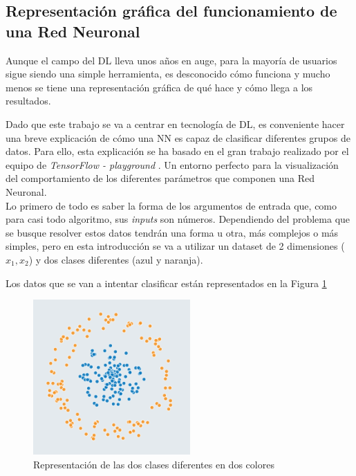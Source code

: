 \subsection{Representación gráfica del funcionamiento de una Red Neuronal}
\label{sec:funcionamiento_DL}

Aunque el campo del DL lleva unos años en auge, para la mayoría de usuarios sigue siendo una simple herramienta, es desconocido cómo funciona y mucho menos se tiene una representación gráfica de qué hace y cómo llega a los resultados.

Dado que este trabajo se va a centrar en tecnología de DL, es conveniente hacer una breve explicación de cómo una NN es capaz de clasificar diferentes grupos de datos. Para ello, esta explicación se ha basado en el gran trabajo realizado por el equipo de \textit{TensorFlow - playground} \cite{TensorFlow_playground}. Un entorno perfecto para la visualización del comportamiento de los diferentes parámetros que componen una Red Neuronal.\\

Lo primero de todo es saber la forma de los argumentos de entrada que, como para casi todo algoritmo, sus \textit{inputs} son números. Dependiendo del problema que se busque resolver estos datos tendrán una forma u otra, más complejos o más simples, pero en esta introducción se va a utilizar un dataset de 2 dimensiones ($x_1,x_2$) y dos clases diferentes (azul y naranja).

Los datos que se van a intentar clasificar están representados en la Figura \ref{datos}

\begin{figure}[h!]
    \centering
    \includegraphics[width=60mm, angle=0]{2/Fotos/datos.png}
    \captionsetup{justification=centering,margin=1.25cm}
    \caption{Representación de las dos clases diferentes en dos colores}
    \label{datos}
\end{figure}

